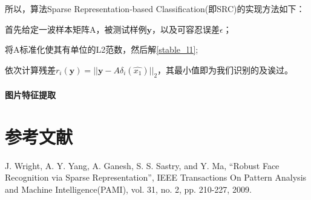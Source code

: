 \documentclass[a4paper,12pt]{article}
\begin{document}
所以，算法Sparse Representation-based Classification(即SRC)的实现方法如下：

首先给定一波样本矩阵A，被测试样例$\boldsymbol{y}$，以及可容忍误差$\epsilon$；

将A标准化使其有单位的L2范数，然后解\eqref{stable_l1};

依次计算残差$r_{i}(\boldsymbol{y}) = ||\boldsymbol{y}-A\delta_{i}(\hat{x_{1}})||_{2}$，其最小值即为我们识别的及诶过。

\paragraph{图片特征提取}


\section{参考文献}
J. Wright, A. Y. Yang, A. Ganesh, S. S. Sastry, and Y. Ma, “Robust Face Recognition via Sparse Representation”, IEEE Transactions On Pattern Analysis and Machine Intelligence(PAMI), vol. 31, no. 2, pp. 210-227, 2009.

\label{LastPage}
\end{document}
